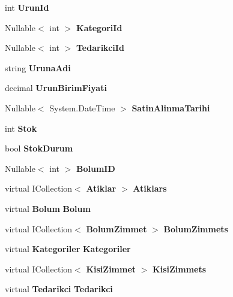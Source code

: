 \begin{DoxyCompactItemize}
\item 
int \textbf{ Urun\+Id}\hspace{0.3cm}{\ttfamily  [get, set]}
\item 
Nullable$<$ int $>$ \textbf{ Kategori\+Id}\hspace{0.3cm}{\ttfamily  [get, set]}
\item 
Nullable$<$ int $>$ \textbf{ Tedarikci\+Id}\hspace{0.3cm}{\ttfamily  [get, set]}
\item 
string \textbf{ Uruna\+Adi}\hspace{0.3cm}{\ttfamily  [get, set]}
\item 
decimal \textbf{ Urun\+Birim\+Fiyati}\hspace{0.3cm}{\ttfamily  [get, set]}
\item 
Nullable$<$ System.\+Date\+Time $>$ \textbf{ Satin\+Alinma\+Tarihi}\hspace{0.3cm}{\ttfamily  [get, set]}
\item 
int \textbf{ Stok}\hspace{0.3cm}{\ttfamily  [get, set]}
\item 
bool \textbf{ Stok\+Durum}\hspace{0.3cm}{\ttfamily  [get, set]}
\item 
Nullable$<$ int $>$ \textbf{ Bolum\+ID}\hspace{0.3cm}{\ttfamily  [get, set]}
\item 
virtual I\+Collection$<$ \textbf{ Atiklar} $>$ \textbf{ Atiklars}\hspace{0.3cm}{\ttfamily  [get, set]}
\item 
virtual \textbf{ Bolum} \textbf{ Bolum}\hspace{0.3cm}{\ttfamily  [get, set]}
\item 
virtual I\+Collection$<$ \textbf{ Bolum\+Zimmet} $>$ \textbf{ Bolum\+Zimmets}\hspace{0.3cm}{\ttfamily  [get, set]}
\item 
virtual \textbf{ Kategoriler} \textbf{ Kategoriler}\hspace{0.3cm}{\ttfamily  [get, set]}
\item 
virtual I\+Collection$<$ \textbf{ Kisi\+Zimmet} $>$ \textbf{ Kisi\+Zimmets}\hspace{0.3cm}{\ttfamily  [get, set]}
\item 
virtual \textbf{ Tedarikci} \textbf{ Tedarikci}\hspace{0.3cm}{\ttfamily  [get, set]}
\end{DoxyCompactItemize}



